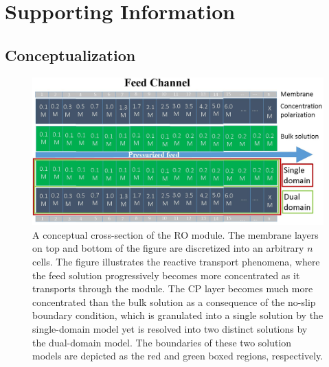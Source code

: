 



\section{Supporting Information}

\begin{supplementary}

\subsection{Conceptualization}

\begin{figure}[h]
    \centering
    \includegraphics[width = \textwidth]{images/ROSSpy//supporting_information/single_dual_domain.jpg}
    \caption{
        A conceptual cross-section of the RO module. The membrane layers on top and bottom of the figure are discretized into an arbitrary $n$ cells. The figure illustrates the reactive transport phenomena, where the feed solution progressively becomes more concentrated as it transports through the module. The CP layer becomes much more concentrated than the bulk solution as a consequence of the no-slip boundary condition, which is granulated into a single solution by the single-domain model  yet is resolved into two distinct solutions by the dual-domain model. The boundaries of these two solution models are depicted as the red and green boxed regions, respectively. 
    }
    \label{single_dual_domain}
\end{figure}


\end{supplementary}
